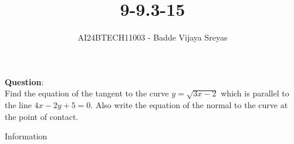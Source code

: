 \documentclass[journal]{IEEEtran}
\begin{document}

\vspace{3cm}

\title{9-9.3-15}
\author{AI24BTECH11003 - Badde Vijaya Sreyas}
{\let\newpage\relax\maketitle}

\renewcommand{\thefigure}{\theenumi}
\renewcommand{\thetable}{\theenumi}
\setlength{\intextsep}{10pt} %


\renewcommand{\thetable}{\theenumi}


\textbf{Question}:\\
Find the equation of the tangent to the curve $y= \sqrt{3x-2}$ which is parallel to the line $4x-2y+5=0$. Also write the equation of the normal to the curve at the point of contact.


\solution
\begin{table}[h!]
	\centering
	
	\caption{Information}
	\label{tab:9-9.3-15}
\end{table}
\end{document}
